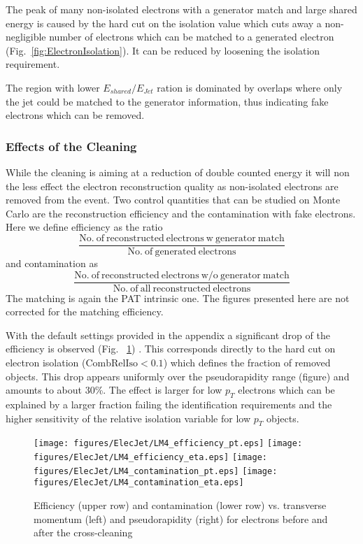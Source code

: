 \documentclass{cmspaper}
\begin{document}
The peak of many non-isolated electrons with a generator match and large shared
energy is caused by the hard cut on the isolation value which cuts away a
non-negligible number of electrons which can be matched to a generated electron
(Fig.~\ref{fig:ElectronIsolation}). It can be reduced by loosening the
isolation requirement.

The region with lower $E_{shared}/E_{Jet}$ ration is dominated by overlaps
where only the jet could be matched to the generator information, thus
indicating fake electrons which can be removed.

\clearpage

\subsubsection{Effects of the Cleaning}

While the cleaning is aiming at a reduction of double counted energy it will
non the less effect the electron reconstruction quality as non-isolated
electrons are removed from the event. Two control quantities that can be
studied on Monte Carlo are the reconstruction efficiency and the contamination
with fake electrons. Here we define efficiency as the ratio 
\[\frac{\mathrm{No.\ of\ reconstructed\ electrons\ w\ generator\ match}}{\mathrm{No.\ of\ generated\ electrons}}\]
and contamination as
\[\frac{\mathrm{No.\ of\ reconstructed\ electrons\ w/o\ generator\ match
}}{\mathrm{No.\ of\ all\ reconstructed\ electrons}}\]
The matching is again the PAT intrinsic one. The figures presented here are not
corrected for the matching efficiency.

With the default settings provided in the appendix a significant drop of the
efficiency is observed (Fig. ~\ref{fig:effCont_elec_ElecJet}) . This
corresponds directly to the hard cut on electron isolation
($\mathrm{CombRelIso}<0.1$) which defines the fraction of removed objects. This
drop appears uniformly over the pseudorapidity range (figure) and amounts to
about 30\%.  The effect is larger for low $p_T$ electrons which can be
explained by a larger fraction failing the identification requirements and the
higher sensitivity of the relative isolation variable for low $p_T$ objects.

\begin{figure}[hb]
\begin{center}
    \texttt{[image: figures/ElecJet/LM4\_efficiency\_pt.eps]}
    \texttt{[image: figures/ElecJet/LM4\_efficiency\_eta.eps]}
    \texttt{[image: figures/ElecJet/LM4\_contamination\_pt.eps]}
    \texttt{[image: figures/ElecJet/LM4\_contamination\_eta.eps]}
    \caption{Efficiency (upper row) and contamination (lower row) vs. transverse
    momentum (left) and pseudorapidity (right) for electrons before and after
    the cross-cleaning} \label{fig:effCont_elec_ElecJet}
\end{center}
\end{figure}
\end{document}
